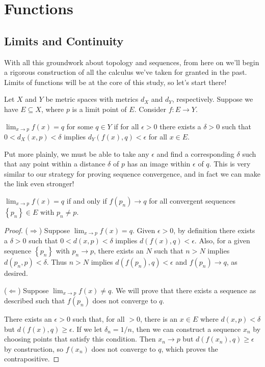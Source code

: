 \documentclass[../m131main.tex]{subfiles}
\begin{document}
\chapter{Functions} \label{ch:funcs}
\section{Limits and Continuity}
With all this groundwork about topology and sequences, from here on we'll begin a rigorous construction of all the calculus we've taken for granted in the past.
Limits of functions will be at the core of this study, so let's start there!

\begin{definition}
    Let $X$ and $Y$ be metric spaces with metrics $d_X$ and $d_Y$, respectively.
    Suppose we have $E \subseteq X$, where $p$ is a limit point of $E$.
    Consider $f : E \to Y$.
    
    $\lim_{x \to p} f(x) = q$ for some $q \in Y$ if for all $\epsilon > 0$ there exists a $\delta > 0$ such that $0 < d_X(x,p) < \delta$ implies $d_Y(f(x),q) < \epsilon$ for all $x \in E$.
\end{definition}

Put more plainly, we must be able to take any $\epsilon$ and find a corresponding $\delta$ such that any point within a distance $\delta$ of $p$ has an image within $\epsilon$ of $q$.
This is very similar to our strategy for proving sequence convergence, and in fact we can make the link even stronger!

\begin{theorem}
    $\lim_{x \to p} f(x) = q$ if and only if $f(p_n) \to q$ for all convergent sequences $\left\{ p_n \right\} \in E$ with $p_n \neq p$.
\end{theorem}

\begin{proof}
    ($\Rightarrow$) Suppose $\lim_{x \to p} f(x) = q$.
    Given $\epsilon > 0$, by definition there exists a $\delta > 0$ such that $0 < d(x,p) < \delta$ implies $d(f(x), q) < \epsilon$.
    Also, for a given sequence $\left\{ p_n \right\}$ with $p_n \to p$, there exists an $N$ such that $n > N$ implies $d(p_n,p) < \delta$.
    Thus $n> N$ implies $d(f(p_n), q) < \epsilon$ and $f(p_n) \to q$, as desired.

    ($\Leftarrow$) Suppose $\lim_{x \to p} f(x) \neq q$.
    We will prove that there exists a sequence as described such that $f(p_n)$ does not converge to $q$.

    There exists an $\epsilon > 0$ such that, for all $ > 0$, there is an $x \in E$ where $d(x,p) < \delta$ but $d(f(x),q) \geq \epsilon$.
    If we let $\delta_n = 1 / n$, then we can construct a sequence $x_n$ by choosing points that satisfy this condition.
    Then $x_n \to p$ but $d(f(x_n),q) \geq \epsilon$ by construction, so $f(x_n)$ does not converge to $q$, which proves the contrapositive.
\end{proof}
\end{document}
